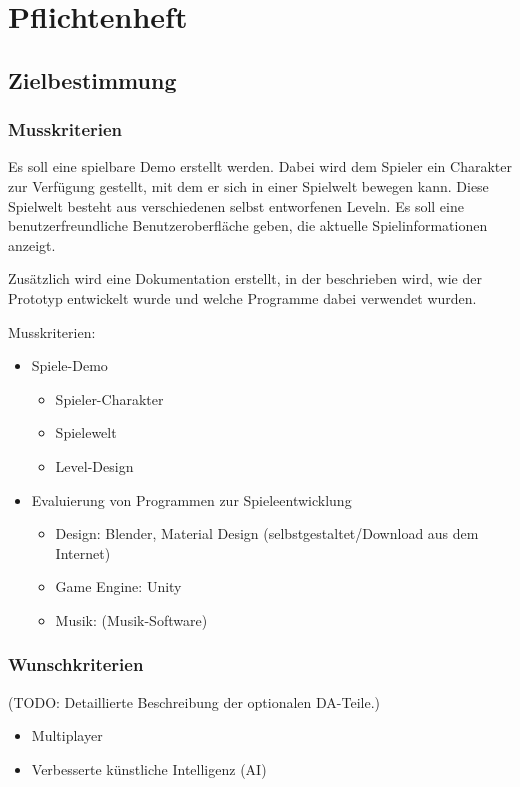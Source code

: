 \pagebreak
{}
\chapter{Pflichtenheft}
\section{Zielbestimmung}
\subsection{Musskriterien}

Es soll eine spielbare Demo erstellt werden. Dabei wird dem Spieler ein Charakter zur Verfügung gestellt, mit dem er sich in einer Spielwelt bewegen kann. Diese Spielwelt besteht aus verschiedenen selbst entworfenen Leveln. Es soll eine benutzerfreundliche Benutzeroberfläche geben, die aktuelle Spielinformationen anzeigt.

Zusätzlich wird eine Dokumentation erstellt, in der beschrieben wird, wie der Prototyp entwickelt wurde und welche Programme dabei verwendet wurden.

Musskriterien:
\begin{itemize}
  \item Spiele-Demo
  \begin{itemize}
    \item Spieler-Charakter
    \item Spielewelt
    \item Level-Design
  \end{itemize}
  \item Evaluierung von Programmen zur Spieleentwicklung
  \begin{itemize}
    \item Design: Blender, Material Design (selbstgestaltet/Download aus dem Internet)
    \item Game Engine: Unity
    \item Musik: (Musik-Software)
  \end{itemize}
\end{itemize}

\subsection{Wunschkriterien}
(TODO: 
Detaillierte Beschreibung der optionalen DA-Teile.)

\begin{itemize}
  \item Multiplayer
  \item Verbesserte künstliche Intelligenz (AI)
\end{itemize}


